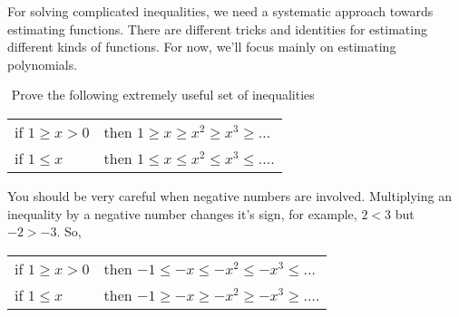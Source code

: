 For solving complicated inequalities, we need a systematic approach towards estimating functions. There are different tricks and identities for estimating different kinds of functions. For now, we'll focus mainly on estimating polynomials.

\begin{exercise}$ $
	\label{q:inequality_1}
	Prove the following extremely useful set of inequalities
	\begin{center}
		\begin{tabular}{ll}
			if $1 \ge x > 0$ &then $ 1 \ge x \ge x^2 \ge x^3 \ge \dots$ \\
			if $1 \le x$ &then $1 \le x \le x^2 \le x^3 \le \dots$.
		\end{tabular}
	\end{center}
\end{exercise}


 You should be very careful when negative numbers are involved. Multiplying an inequality by a negative number changes it's sign, for example, $2 < 3$ but $-2 > -3$. So,
\begin{center}
	\begin{tabular}{ll}
		if $1 \ge x > 0$ &then $ -1 \le -x \le -x^2 \le -x^3 \le \dots$ \\
		if $1 \le x$ &then $-1 \ge -x \ge -x^2 \ge -x^3 \ge \dots$.
	\end{tabular}
\end{center}


